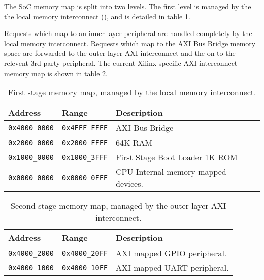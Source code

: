 
The SoC memory map is split into two levels.
The first level is managed by the the local memory interconnect
(),
and is detailed in table \ref{tab:memory-map:1}.

Requests which map to an inner layer peripheral are handled completely
by the local memory interconnect.
Requests which map to the AXI Bus Bridge memory space are forwarded to
the outer layer AXI interconnect and the on to the relevent 3rd party
peripheral.
The current Xilinx specific AXI interconnect memory map is shown in
table \ref{tab:memory-map:2}.

\begin{table}[H]
\centering
\begin{tabular}{lll}
Address      & Range        & Description   \\ \hline
{\tt 0x4000\_0000} & {\tt 0x4FFF\_FFFF} & AXI Bus Bridge                    \\
{\tt 0x2000\_0000} & {\tt 0x2000\_FFFF} & 64K RAM                           \\
{\tt 0x1000\_0000} & {\tt 0x1000\_3FFF} & First Stage Boot Loader 1K ROM    \\
{\tt 0x0000\_0000} & {\tt 0x0000\_0FFF} & CPU Internal memory mapped devices.
\end{tabular}
\caption{
    First stage \SCARVSOC memory map, managed by the local memory
    interconnect.
}
\label{tab:memory-map:1}
\end{table}

\begin{table}[H]
\centering
\begin{tabular}{lll}
Address      & Range        & Description  \\ \hline
{\tt 0x4000\_2000} & {\tt 0x4000\_20FF} & AXI mapped GPIO peripheral.  \\
{\tt 0x4000\_1000} & {\tt 0x4000\_10FF} & AXI mapped UART peripheral.  \\
\end{tabular}
\caption{
    Second stage \SCARVSOC memory map, managed by the outer layer
    AXI interconnect.
}
\label{tab:memory-map:2}
\end{table}

